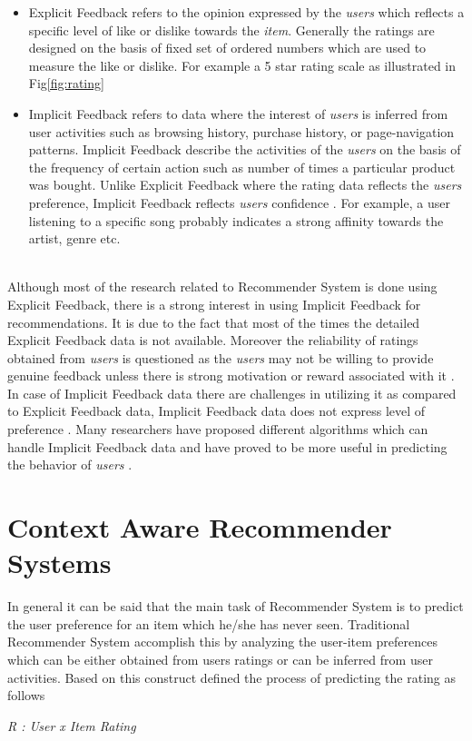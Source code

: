 \begin{itemize}
    \item Explicit Feedback refers to the opinion expressed by the \emph{users} which reflects a specific level of like or dislike towards the \emph{item}. Generally the ratings are designed on the basis of fixed set of ordered numbers which are used to measure the like or dislike\autocite[11]{Mertens1997}. For example a 5 star rating scale as illustrated in Fig\ref{fig:rating} 
    
    \item Implicit Feedback refers to data where the interest of \emph{users} is inferred from user activities such as browsing history, purchase history, or page-navigation patterns. Implicit Feedback describe the activities of the \emph{users} on the basis of the frequency of certain action such as number of times a particular product was bought\autocite[2]{Hu2008}. Unlike Explicit Feedback where the rating data reflects the \emph{users} preference, Implicit Feedback reflects \emph{users} confidence \autocite[2]{Hu2008}. For example, a user listening to a specific song probably indicates a strong affinity towards the artist, genre etc.
\end{itemize} 
\\
Although most of the research related to Recommender System is done using Explicit Feedback, there is a strong interest in using Implicit Feedback for recommendations. It is due to the fact that most of the times the detailed Explicit Feedback data is not available. Moreover the reliability of ratings obtained from \emph{users} is questioned as the \emph{users} may not be willing to provide genuine feedback unless there is strong motivation or reward associated with it \autocite[33]{Claypool1999CombiningCA}. In case of Implicit Feedback data there are challenges in utilizing it as compared to Explicit Feedback data, Implicit Feedback data does not express level of preference \autocite[2]{Hu2008}. Many researchers have proposed different algorithms which can handle Implicit Feedback data and have proved to be more useful in predicting the behavior of \emph{users} \autocite[2]{Koren2015}. \\


\section{Context Aware Recommender Systems}
In general it can be said that the main task of Recommender System is to predict the user preference for an item which he/she has never seen. Traditional Recommender System accomplish this by analyzing the user-item preferences which can be either obtained from users ratings or can be inferred from user activities. Based on this construct \textcite[8]{Adomavicius2011} defined the process of predicting the rating as follows \\
 \begin{center}
                \emph{R : User x Item \rightarrow Rating} \\
                \\
 \end{center}
     

